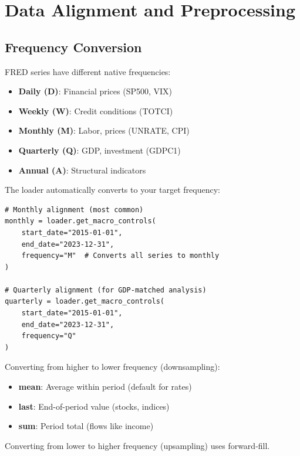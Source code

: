 \section{Data Alignment and Preprocessing}\label{sec:data_alignment}

\subsection{Frequency Conversion}

FRED series have different native frequencies:
\begin{itemize}
    \item \textbf{Daily (D)}: Financial prices (SP500, VIX)
    \item \textbf{Weekly (W)}: Credit conditions (TOTCI)
    \item \textbf{Monthly (M)}: Labor, prices (UNRATE, CPI)
    \item \textbf{Quarterly (Q)}: GDP, investment (GDPC1)
    \item \textbf{Annual (A)}: Structural indicators
\end{itemize}

The loader automatically converts to your target frequency:

\begin{verbatim}
# Monthly alignment (most common)
monthly = loader.get_macro_controls(
    start_date="2015-01-01",
    end_date="2023-12-31",
    frequency="M"  # Converts all series to monthly
)

# Quarterly alignment (for GDP-matched analysis)
quarterly = loader.get_macro_controls(
    start_date="2015-01-01",
    end_date="2023-12-31",
    frequency="Q"
)
\end{verbatim}

\begin{definition}
\label{def:freq_conversion}
Converting from higher to lower frequency (downsampling):
\begin{itemize}
    \item \textbf{mean}: Average within period (default for rates)
    \item \textbf{last}: End-of-period value (stocks, indices)
    \item \textbf{sum}: Period total (flows like income)
\end{itemize}

Converting from lower to higher frequency (upsampling) uses forward-fill.
\end{definition}

